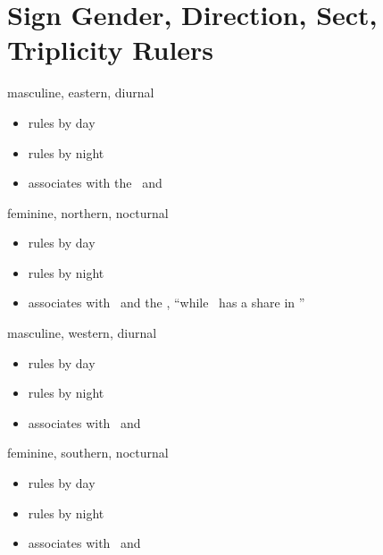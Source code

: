 \section{Sign Gender, Direction, Sect, Triplicity Rulers}

\begin{description}[labelindent=0em , labelwidth=1em, labelsep=1em, leftmargin =!]
\item[\Aries-\Leo-\Sagittarius]
	masculine, eastern, diurnal
	\begin{itemize}
		\item[\Sun] rules by day
		\item[\Jupiter] rules by night
		\item[\Saturn] associates with the \Sun\, and \Jupiter
	\end{itemize}
	
\item[\Taurus-\Virgo-\Capricorn]
	feminine, northern, nocturnal
	\begin{itemize}
		\item[\Venus] rules by day
		\item[\Moon] rules by night
		\item[\Mars] associates with \Venus\, and the \Moon, ``while \Mercury\, has a share in \Virgo''
	\end{itemize}	
	
\item[\Gemini-\Libra-\Aquarius] 
	masculine, western, diurnal
	\begin{itemize}
		\item[\Saturn] rules by day
		\item[\Mercury] rules by night
		\item[\Jupiter] associates with \Saturn\, and \Mercury
	\end{itemize}
	
\item[\Cancer-\Scorpio-\Pisces]
	feminine, southern, nocturnal
	\begin{itemize}
		\item[\Venus] rules by day
		\item[\Mars] rules by night
		\item[\Moon] associates with \Venus\, and \Mars
	\end{itemize}
	
\end{description}